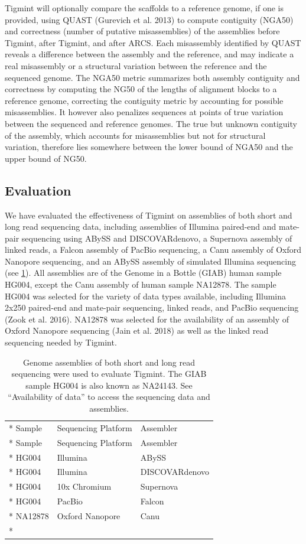 \documentclass[
  12pt,
  oneside,
  openany]{book}
\begin{document}
Tigmint will optionally compare the scaffolds to a reference genome, if one is provided, using QUAST (Gurevich et al. 2013) to compute contiguity (NGA50) and correctness (number of putative misassemblies) of the assemblies before Tigmint, after Tigmint, and after ARCS. Each misassembly identified by QUAST reveals a difference between the assembly and the reference, and may indicate a real misassembly or a structural variation between the reference and the sequenced genome. The NGA50 metric summarizes both assembly contiguity and correctness by computing the NG50 of the lengths of alignment blocks to a reference genome, correcting the contiguity metric by accounting for possible misassemblies. It however also penalizes sequences at points of true variation between the sequenced and reference genomes. The true but unknown contiguity of the assembly, which accounts for misassemblies but not for structural variation, therefore lies somewhere between the lower bound of NGA50 and the upper bound of NG50.

\hypertarget{evaluation}{%
\subsection{Evaluation}\label{evaluation}}

We have evaluated the effectiveness of Tigmint on assemblies of both short and long read sequencing data, including assemblies of Illumina paired-end and mate-pair sequencing using ABySS and DISCOVARdenovo, a Supernova assembly of linked reads, a Falcon assembly of PacBio sequencing, a Canu assembly of Oxford Nanopore sequencing, and an ABySS assembly of simulated Illumina sequencing (see \cref{tbl:data}). All assemblies are of the Genome in a Bottle (GIAB) human sample HG004, except the Canu assembly of human sample NA12878. The sample HG004 was selected for the variety of data types available, including Illumina 2x250 paired-end and mate-pair sequencing, linked reads, and PacBio sequencing (Zook et al. 2016). NA12878 was selected for the availability of an assembly of Oxford Nanopore sequencing (Jain et al. 2018) as well as the linked read sequencing needed by Tigmint.

\hypertarget{tbl:data}{}
\begin{singlespace}
\small
\begin{longtable}[]{@{}lll@{}}
\caption[Genome assemblies of both short and long read sequencing were used to evaluate Tigmint.]{\label{tbl:data}Genome assemblies of both short and long read sequencing were used to evaluate Tigmint. The GIAB sample HG004 is also known as NA24143. See ``Availability of data'' to access the sequencing data and assemblies.}\tabularnewline*
\toprule
Sample & Sequencing Platform & Assembler\tabularnewline*
\midrule
\endfirsthead
\toprule
Sample & Sequencing Platform & Assembler\tabularnewline*
\midrule
\endhead
HG004 & Illumina & ABySS\tabularnewline*
HG004 & Illumina & DISCOVARdenovo\tabularnewline*
HG004 & 10x Chromium & Supernova\tabularnewline*
HG004 & PacBio & Falcon\tabularnewline*
NA12878 & Oxford Nanopore & Canu\tabularnewline*
\bottomrule
\end{longtable}
\end{singlespace}
\end{document}
